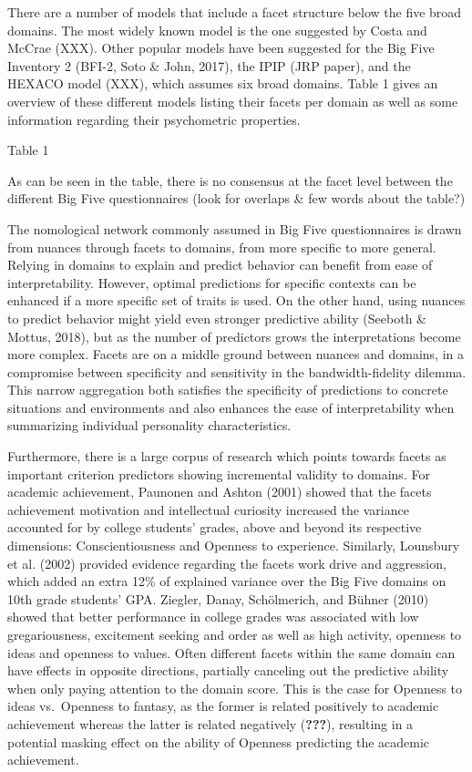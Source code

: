\documentclass[man]{apa6}
\theoremstyle{definition}
\theoremstyle{definition}
\theoremstyle{definition}
\theoremstyle{remark}
\begin{document}
There are a number of models that include a facet structure below the
five broad domains. The most widely known model is the one suggested by
Costa and McCrae (XXX). Other popular models have been suggested for the
Big Five Inventory 2 (BFI-2, Soto \& John, 2017), the IPIP (JRP paper),
and the HEXACO model (XXX), which assumes six broad domains. Table 1
gives an overview of these different models listing their facets per
domain as well as some information regarding their psychometric
properties.

Table 1

As can be seen in the table, there is no consensus at the facet level
between the different Big Five questionnaires (look for overlaps \& few
words about the table?)

The nomological network commonly assumed in Big Five questionnaires is
drawn from nuances through facets to domains, from more specific to more
general. Relying in domains to explain and predict behavior can benefit
from ease of interpretability. However, optimal predictions for specific
contexts can be enhanced if a more specific set of traits is used. On
the other hand, using nuances to predict behavior might yield even
stronger predictive ability (Seeboth \& Mottus, 2018), but as the number
of predictors grows the interpretations become more complex. Facets are
on a middle ground between nuances and domains, in a compromise between
specificity and sensitivity in the bandwidth-fidelity dilemma. This
narrow aggregation both satisfies the specificity of predictions to
concrete situations and environments and also enhances the ease of
interpretability when summarizing individual personality
characteristics.

Furthermore, there is a large corpus of research which points towards
facets as important criterion predictors showing incremental validity to
domains. For academic achievement, Paunonen and Ashton (2001) showed
that the facets achievement motivation and intellectual curiosity
increased the variance accounted for by college students' grades, above
and beyond its respective dimensions: Conscientiousness and Openness to
experience. Similarly, Lounsbury et al. (2002) provided evidence
regarding the facets work drive and aggression, which added an extra
12\% of explained variance over the Big Five domains on 10th grade
students' GPA. Ziegler, Danay, Schölmerich, and Bühner (2010) showed
that better performance in college grades was associated with low
gregariousness, excitement seeking and order as well as high activity,
openness to ideas and openness to values. Often different facets within
the same domain can have effects in opposite directions, partially
canceling out the predictive ability when only paying attention to the
domain score. This is the case for Openness to ideas vs.~Openness to
fantasy, as the former is related positively to academic achievement
whereas the latter is related negatively ({\textbf{???}}), resulting in
a potential masking effect on the ability of Openness predicting the
academic achievement.
\end{document}
